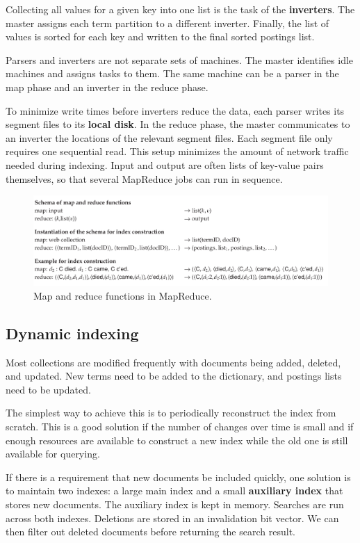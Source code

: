 \documentclass[letterpaper,11pt]{article}
\begin{document}
Collecting all values for a given key into one list is the task of the \textbf{inverters}. The master assigns each term partition to a different inverter. Finally, the list of values is sorted for each key and written to the final sorted postings list.

Parsers and inverters are not separate sets of machines. The master identifies idle machines and assigns tasks to them. The same machine can be a parser in the map phase and an inverter in the reduce phase.

To minimize write times before inverters reduce the data, each parser writes its segment files to its \textbf{local disk}. In the reduce phase, the master communicates to an inverter the locations of the relevant segment files. Each segment file only requires one sequential read. This setup minimizes the amount of network traffic needed during indexing. Input and output are often lists of key-value pairs themselves, so that several MapReduce jobs can run in sequence.

\begin{figure}[H]
    \centering
    \includegraphics[scale=0.45]{sect4/figure_4_6.png}
    \caption{Map and reduce functions in MapReduce.}
\end{figure}

\subsection{Dynamic indexing}
Most collections are modified frequently with documents being added, deleted, and updated. New terms need to be added to the dictionary, and postings lists need to be updated.

The simplest way to achieve this is to periodically reconstruct the index from scratch. This is a good solution if the number of changes over time is small and if enough resources are available to construct a new index while the old one is still available for querying.

If there is a requirement that new documents be included quickly, one solution is to maintain two indexes: a large main index and a small \textbf{auxiliary index} that stores new documents. The auxiliary index is kept in memory. Searches are run across both indexes. Deletions are stored in an invalidation bit vector. We can then filter out deleted documents before returning the search result.
\end{document}
